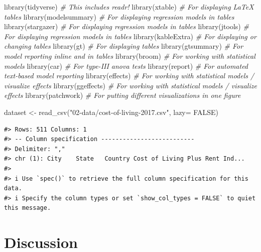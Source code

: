 \documentclass[
  11pt,
  a4paper,
  twoside]{scrbook}
\newenvironment{Shaded}{\begin{snugshade}}{\end{snugshade}}
\newcommand{\AttributeTok}[1]{\textcolor[rgb]{0.77,0.63,0.00}{#1}}
\newcommand{\CommentTok}[1]{\textcolor[rgb]{0.56,0.35,0.01}{\textit{#1}}}
\newcommand{\ConstantTok}[1]{\textcolor[rgb]{0.00,0.00,0.00}{#1}}
\newcommand{\FunctionTok}[1]{\textcolor[rgb]{0.00,0.00,0.00}{#1}}
\newcommand{\NormalTok}[1]{#1}
\newcommand{\OtherTok}[1]{\textcolor[rgb]{0.56,0.35,0.01}{#1}}
\newcommand{\StringTok}[1]{\textcolor[rgb]{0.31,0.60,0.02}{#1}}
\begin{document}
\begin{Shaded}
\begin{Highlighting}[]
\FunctionTok{library}\NormalTok{(tidyverse) }\CommentTok{\# This includes readr!}
\FunctionTok{library}\NormalTok{(xtable) }\CommentTok{\# For displaying LaTeX tables}
\FunctionTok{library}\NormalTok{(modelsummary) }\CommentTok{\# For displaying regression models in tables}
\FunctionTok{library}\NormalTok{(stargazer) }\CommentTok{\# For displaying regression models in tables}
\FunctionTok{library}\NormalTok{(jtools) }\CommentTok{\# For displaying regression models in tables}
\FunctionTok{library}\NormalTok{(kableExtra) }\CommentTok{\# For displaying or changing tables}
\FunctionTok{library}\NormalTok{(gt) }\CommentTok{\# For displaying tables}
\FunctionTok{library}\NormalTok{(gtsummary) }\CommentTok{\# For model reporting inline and in tables}
\FunctionTok{library}\NormalTok{(broom) }\CommentTok{\# For working with statistical models}
\FunctionTok{library}\NormalTok{(car) }\CommentTok{\# For type{-}III anova tests}
\FunctionTok{library}\NormalTok{(report) }\CommentTok{\# For automated text{-}based model reporting}
\FunctionTok{library}\NormalTok{(effects) }\CommentTok{\# For working with statistical models / visualize effects}
\FunctionTok{library}\NormalTok{(ggeffects) }\CommentTok{\# For working with statistical models / visualize effects}
\FunctionTok{library}\NormalTok{(patchwork) }\CommentTok{\# For putting different visualizations in one figure}

\NormalTok{dataset }\OtherTok{\textless{}{-}} \FunctionTok{read\_csv}\NormalTok{(}\StringTok{"02{-}data/cost{-}of{-}living{-}2017.csv"}\NormalTok{, }\AttributeTok{lazy=} \ConstantTok{FALSE}\NormalTok{)}
\end{Highlighting}
\end{Shaded}

\linespread{1}

\begin{verbatim}
#> Rows: 511 Columns: 1
#> -- Column specification --------------------------
#> Delimiter: ","
#> chr (1): City    State   Country Cost of Living Plus Rent Ind...
#> 
#> i Use `spec()` to retrieve the full column specification for this data.
#> i Specify the column types or set `show_col_types = FALSE` to quiet this message.
\end{verbatim}

\hypertarget{discussion-1}{%
\chapter{Discussion}\label{discussion-1}}
\end{document}
